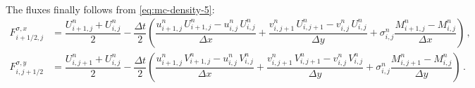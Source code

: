 \documentclass{article}
\numberwithin{equation}{section}
\begin{document}
\begin{enumerate}
\begin{equation}
\begin{aligned}
					\end{aligned}
				\end{equation}
				The fluxes finally follows from \eqref{eq:mc-density-5}:
				\begin{subequations}
					\begin{align}
						F_{i+1/2,j}^{\sigma,x} & = \dfrac{U_{i+1,j}^n + U_{i,j}^n}{2} - \dfrac{\Delta t}{2} \left( \dfrac{u_{i+1,j}^n \, U_{i+1,j}^n - u_{i,j}^n \, U_{i,j}^n}{\Delta x} + \dfrac{v_{i,j+1}^n \, U_{i,j+1}^n - v_{i,j}^n \, U_{i,j}^n}{\Delta y} + \sigma_{i,j}^n \dfrac{M_{i+1,j}^n - M_{i,j}^n}{\Delta x} \right) \, , \\
						F_{i,j+1/2}^{\sigma,y} & = \dfrac{U_{i,j+1}^n + U_{i,j}^n}{2} - \dfrac{\Delta t}{2} \left( \dfrac{u_{i+1,j}^n \, V_{i+1,j}^n - u_{i,j}^n \, V_{i,j}^n}{\Delta x} + \dfrac{v_{i,j+1}^n \, V_{i,j+1}^n - v_{i,j}^n \, V_{i,j}^n}{\Delta y} + \sigma_{i,j}^n \dfrac{M_{i,j+1}^n - M_{i,j}^n}{\Delta y} \right) \, .
					\end{align}
				\end{subequations}
		\end{enumerate}
\end{document}
